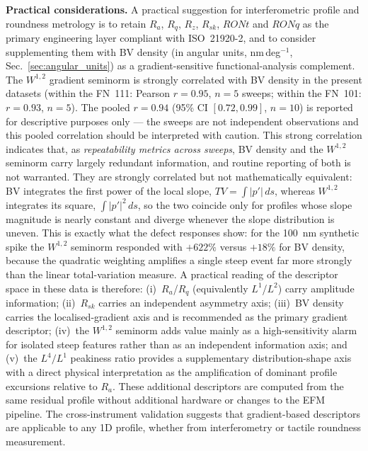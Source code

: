 \documentclass[review]{elsarticle}
\begin{document}
\textbf{Practical considerations.} A practical suggestion for interferometric profile and roundness metrology is to retain $R_a$, $R_q$, $R_z$, $R_{sk}$, $RONt$ and $RONq$ as the primary engineering layer compliant with ISO~21920-2, and to consider supplementing them with BV density (in angular units, nm\,deg$^{-1}$, Sec.~\ref{sec:angular_units}) as a gradient-sensitive functional-analysis complement. The $W^{1,2}$ gradient seminorm is strongly correlated with BV density in the present datasets (within the FN~111: Pearson $r=0.95$, $n=5$ sweeps; within the FN~101: $r=0.93$, $n=5$). The pooled $r=0.94$ (95\% CI $[0.72,0.99]$, $n=10$) is reported for descriptive purposes only --- the sweeps are not independent observations and this pooled correlation should be interpreted with caution. This strong correlation indicates that, as \emph{repeatability metrics across sweeps}, BV density and the $W^{1,2}$ seminorm carry largely redundant information, and routine reporting of both is not warranted. They are strongly correlated but not mathematically equivalent: BV integrates the first power of the local slope, $TV=\int|p'|\,ds$, whereas $W^{1,2}$ integrates its square, $\int|p'|^2\,ds$, so the two coincide only for profiles whose slope magnitude is nearly constant and diverge whenever the slope distribution is uneven. This is exactly what the defect responses show: for the 100~nm synthetic spike the $W^{1,2}$ seminorm responded with $+622\%$ versus $+18\%$ for BV density, because the quadratic weighting amplifies a single steep event far more strongly than the linear total-variation measure. A practical reading of the descriptor space in these data is therefore: (i)~$R_a$/$R_q$ (equivalently $L^1$/$L^2$) carry amplitude information; (ii)~$R_{sk}$ carries an independent asymmetry axis; (iii)~BV density carries the localised-gradient axis and is recommended as the primary gradient descriptor; (iv)~the $W^{1,2}$ seminorm adds value mainly as a high-sensitivity alarm for isolated steep features rather than as an independent information axis; and (v)~the $L^4/L^1$ peakiness ratio provides a supplementary distribution-shape axis with a direct physical interpretation as the amplification of dominant profile excursions relative to $R_a$. These additional descriptors are computed from the same residual profile without additional hardware or changes to the EFM pipeline. The cross-instrument validation suggests that gradient-based descriptors are applicable to any 1D profile, whether from interferometry or tactile roundness measurement.
\end{document}
